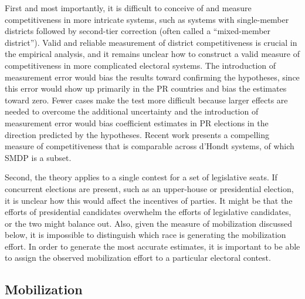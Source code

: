 \documentclass[12pt]{article}
\begin{document}
First and most importantly, it is difficult to conceive of and measure competitiveness in more intricate systems, such as systems with single-member districts followed by second-tier correction (often called a ``mixed-member district''). Valid and reliable measurement of district competitiveness is crucial in the empirical analysis, and it remains unclear how to construct a valid measure of competitiveness in more complicated electoral systems. The introduction of measurement error would bias the results toward confirming the hypotheses, since this error would show up primarily in the PR countries and bias the estimates toward zero. Fewer cases make the test more difficult because larger effects are needed to overcome the additional uncertainty and the introduction of measurement error would bias coefficient estimates in PR elections in the direction predicted by the hypotheses. Recent work \citep{GrofmanSelb2009} presents a compelling measure of competitiveness that is comparable across d'Hondt systems, of which SMDP is a subset. 

Second, the theory applies to a single contest for a set of legislative seats. If concurrent elections are present, such as an upper-house or presidential election, it is unclear how this would affect the incentives of parties. It might be that the efforts of presidential candidates overwhelm the efforts of legislative candidates, or the two might balance out. Also, given the measure of mobilization discussed below, it is impossible to distinguish which race is generating the mobilization effort. In order to generate the most accurate estimates, it is important to be able to assign the observed mobilization effort to a particular electoral contest.

\subsection*{Mobilization}
\end{document}
